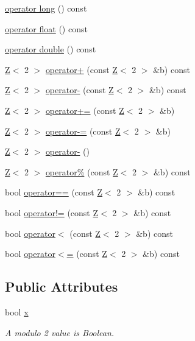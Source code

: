 \begin{DoxyCompactItemize}
\item 
\hyperlink{classZ_3_012_01_4_a84e96e6a70766a5c2e82bad32bb3892b}{operator long} () const
\item 
\hyperlink{classZ_3_012_01_4_a1445b41ddb6be805e59067adaaa45294}{operator float} () const
\item 
\hyperlink{classZ_3_012_01_4_afc37211cc313fbcf3577916c70661283}{operator double} () const
\item 
\hyperlink{classZ}{Z}$<$ 2 $>$ \hyperlink{classZ_3_012_01_4_acb91754a2634eee60b51ea29b8cfe347}{operator+} (const \hyperlink{classZ}{Z}$<$ 2 $>$ \&b) const
\item 
\hyperlink{classZ}{Z}$<$ 2 $>$ \hyperlink{classZ_3_012_01_4_a4a983a0acbe231f84fdc948c64996a55}{operator-\/} (const \hyperlink{classZ}{Z}$<$ 2 $>$ \&b) const
\item 
\hyperlink{classZ}{Z}$<$ 2 $>$ \hyperlink{classZ_3_012_01_4_abe24998e8f1ba064141ad5f3d04fb7e1}{operator+=} (const \hyperlink{classZ}{Z}$<$ 2 $>$ \&b)
\item 
\hyperlink{classZ}{Z}$<$ 2 $>$ \hyperlink{classZ_3_012_01_4_aac3bc93e616ba069f99e794dad872799}{operator-\/=} (const \hyperlink{classZ}{Z}$<$ 2 $>$ \&b)
\item 
\hyperlink{classZ}{Z}$<$ 2 $>$ \hyperlink{classZ_3_012_01_4_a72004bd105e0df1330f7c1f61919b9dd}{operator-\/} ()
\item 
\hyperlink{classZ}{Z}$<$ 2 $>$ \hyperlink{classZ_3_012_01_4_a665bdbcbcf9b9787d7bcf40c6a716ec3}{operator\%} (const \hyperlink{classZ}{Z}$<$ 2 $>$ \&b) const
\item 
bool \hyperlink{classZ_3_012_01_4_a98508d39c9695bdda292044170ef5718}{operator==} (const \hyperlink{classZ}{Z}$<$ 2 $>$ \&b) const
\item 
bool \hyperlink{classZ_3_012_01_4_a0003dbeab72988aea1e4b8034f5fa29d}{operator!=} (const \hyperlink{classZ}{Z}$<$ 2 $>$ \&b) const
\item 
bool \hyperlink{classZ_3_012_01_4_aec8e51a2935d539f11220270f35c1c31}{operator$<$} (const \hyperlink{classZ}{Z}$<$ 2 $>$ \&b) const
\item 
bool \hyperlink{classZ_3_012_01_4_a6e1b77419935d4f017ffab84df3ca520}{operator$<$=} (const \hyperlink{classZ}{Z}$<$ 2 $>$ \&b) const
\end{DoxyCompactItemize}
\subsection*{Public Attributes}
\begin{DoxyCompactItemize}
\item 
bool \hyperlink{classZ_3_012_01_4_ae753e180f5d8aa55370a497e2c86fbb8}{x}
\begin{DoxyCompactList}\small\item\em A modulo 2 value is Boolean. \end{DoxyCompactList}\end{DoxyCompactItemize}
